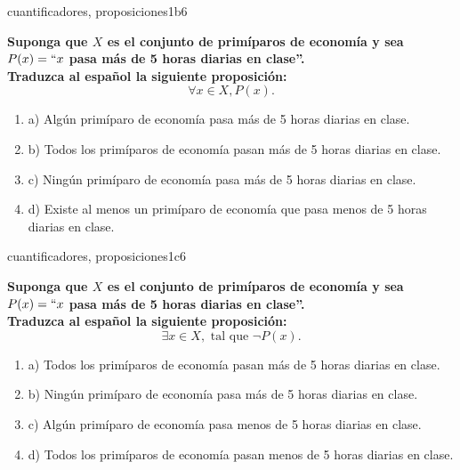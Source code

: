 \documentclass{article}
\begin{document}
\begin{question}{37}{cuantificadores, proposiciones}{1}{b}{6}{
\textbf{Suponga que $X$ es el conjunto de primíparos de economía y sea $P(x)=``x$ pasa más de 5 horas diarias en clase''.}\\

\textbf{Traduzca al español la siguiente proposición:}
\[
\forall x \in X, P(x).
\]

\begin{enumerate}
\item a) Algún primíparo de economía pasa más de 5 horas diarias en clase.
\item b) Todos los primíparos de economía pasan más de 5 horas diarias en clase.
\item c) Ningún primíparo de economía pasa más de 5 horas diarias en clase.
\item d) Existe al menos un primíparo de economía que pasa menos de 5 horas diarias en clase.
\end{enumerate}
}
\end{question}

\begin{question}{38}{cuantificadores, proposiciones}{1}{c}{6}{
\textbf{Suponga que $X$ es el conjunto de primíparos de economía y sea $P(x)=``x$ pasa más de 5 horas diarias en clase''.}\\

\textbf{Traduzca al español la siguiente proposición:}
\[
\exists x \in X, \text{ tal que } \neg P(x).
\]

\begin{enumerate}
\item a) Todos los primíparos de economía pasan más de 5 horas diarias en clase.
\item b) Ningún primíparo de economía pasa más de 5 horas diarias en clase.
\item c) Algún primíparo de economía pasa menos de 5 horas diarias en clase.
\item d) Todos los primíparos de economía pasan menos de 5 horas diarias en clase.
\end{enumerate}
}
\end{question}
\end{document}
